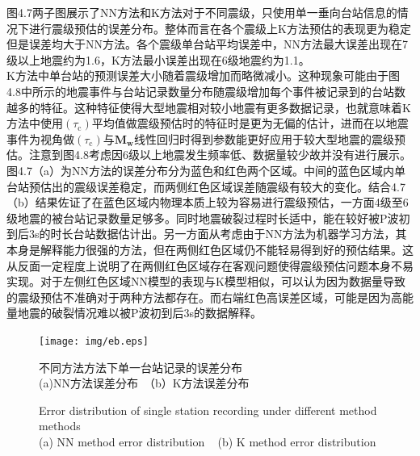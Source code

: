 \indent 图4.7两子图展示了NN方法和K方法对于不同震级，只使用单一垂向台站信息的情况下进行震级预估的误差分布。整体而言在各个震级上K方法预估的表现更为稳定但是误差均大于NN方法。各个震级单台站平均误差中，NN方法最大误差出现在7级以上地震约为1.6，K方法最小误差出现在6级地震约为1.1。\\
\indent K方法中单台站的预测误差大小随着震级增加而略微减小。这种现象可能由于图4.8中所示的地震事件与台站记录数量分布随震级增加每个事件被记录到的台站数越多的特征。这种特征使得大型地震相对较小地震有更多数据记录，也就意味着K方法中使用$\left(\tau_{\mathrm{c}}\right)$平均值做震级预估时的特征时是更为无偏的估计，进而在以地震事件为视角做$\left(\tau_{\mathrm{c}}\right)$与$\mathbf{M}_{\mathbf{w}}$线性回归时得到参数能更好应用于较大型地震的震级预估。注意到图4.8考虑因6级以上地震发生频率低、数据量较少故并没有进行展示。\\
\indent 图4.7（a）为NN方法的误差分布分为蓝色和红色两个区域。中间的蓝色区域内单台站预估出的震级误差稳定，而两侧红色区域误差随震级有较大的变化。结合4.7（b）结果佐证了在蓝色区域内物理本质上较为容易进行震级预估，一方面4级至6级地震的被台站记录数量足够多。同时地震破裂过程时长适中，能在较好被P波初到后3s的时长台站数据估计出。另一方面从考虑由于NN方法为机器学习方法，其本身是解释能力很强的方法，但在两侧红色区域仍不能轻易得到好的预估结果。这从反面一定程度上说明了在两侧红色区域存在客观问题使得震级预估问题本身不易实现。对于左侧红色区域NN模型的表现与K模型相似，可以认为因为数据量导致的震级预估不准确对于两种方法都存在。而右端红色高误差区域，可能是因为高能量地震的破裂情况难以被P波初到后3s的数据解释。\\
\begin{figure}[h] 
\centering 
\texttt{[image: img/eb.eps]} 
\renewcommand{\figurename}{图} 
\caption{不同方法方法下单一台站记录的误差分布\\
(a)NN方法误差分布~（b）K方法误差分布} 
\addtocounter{figure}{-1} \vspace{-5pt} 
\renewcommand{\figurename}{Fig} 
\caption{Error distribution of single station recording under different method methods\\
(a) NN method error distribution ~ (b) K method error distribution} 
\renewcommand{\figurename}{图} 
\label{fig:network-device-influence.png} 
\end{figure}
